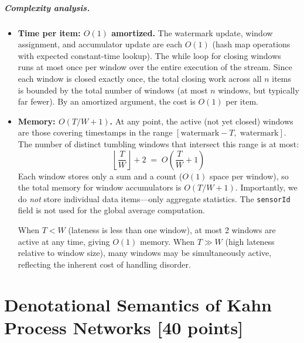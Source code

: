 \documentclass[11pt]{article}
\newcommand{\mnt}[1]{{\small\texttt{#1}}}
\theoremstyle{definition}
\begin{document}
\subparagraph{Complexity analysis.}

\begin{itemize}
	\item \textbf{Time per item: $O(1)$ amortized.} The watermark update, window assignment, and accumulator update are each $O(1)$ (hash map operations with expected constant-time lookup). The while loop for closing windows runs at most once per window over the entire execution of the stream. Since each window is closed exactly once, the total closing work across all $n$ items is bounded by the total number of windows (at most $n$ windows, but typically far fewer). By an amortized argument, the cost is $O(1)$ per item.

	\item \textbf{Memory: $O(T/W + 1)$.} At any point, the active (not yet closed) windows are those covering timestamps in the range $[\text{watermark} - T,\; \text{watermark}]$. The number of distinct tumbling windows that intersect this range is at most:
	      \[
		      \left\lfloor \frac{T}{W} \right\rfloor + 2 \;=\; O\!\left(\frac{T}{W} + 1\right)
	      \]
	      Each window stores only a sum and a count ($O(1)$ space per window), so the total memory for window accumulators is $O(T/W + 1)$. Importantly, we do \emph{not} store individual data items---only aggregate statistics. The \mnt{sensorId} field is not used for the global average computation.

	      When $T < W$ (lateness is less than one window), at most 2 windows are active at any time, giving $O(1)$ memory. When $T \gg W$ (high lateness relative to window size), many windows may be simultaneously active, reflecting the inherent cost of handling disorder.
\end{itemize}

\clearpage %
\section{Denotational Semantics of Kahn Process Networks [40 points]}
\end{document}
